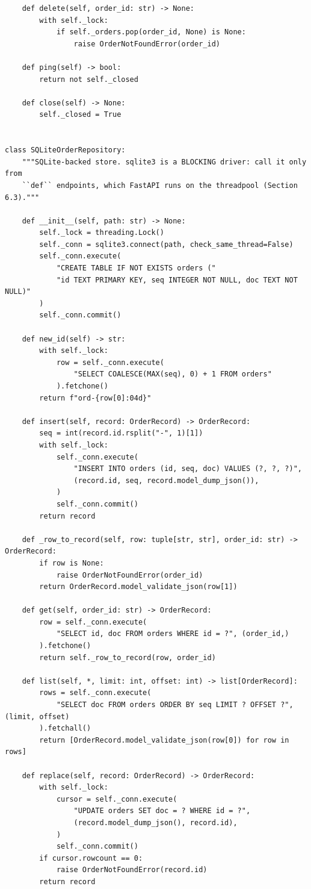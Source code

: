 \begin{verbatim}
    def delete(self, order_id: str) -> None:
        with self._lock:
            if self._orders.pop(order_id, None) is None:
                raise OrderNotFoundError(order_id)

    def ping(self) -> bool:
        return not self._closed

    def close(self) -> None:
        self._closed = True


class SQLiteOrderRepository:
    """SQLite-backed store. sqlite3 is a BLOCKING driver: call it only from
    ``def`` endpoints, which FastAPI runs on the threadpool (Section 6.3)."""

    def __init__(self, path: str) -> None:
        self._lock = threading.Lock()
        self._conn = sqlite3.connect(path, check_same_thread=False)
        self._conn.execute(
            "CREATE TABLE IF NOT EXISTS orders ("
            "id TEXT PRIMARY KEY, seq INTEGER NOT NULL, doc TEXT NOT NULL)"
        )
        self._conn.commit()

    def new_id(self) -> str:
        with self._lock:
            row = self._conn.execute(
                "SELECT COALESCE(MAX(seq), 0) + 1 FROM orders"
            ).fetchone()
        return f"ord-{row[0]:04d}"

    def insert(self, record: OrderRecord) -> OrderRecord:
        seq = int(record.id.rsplit("-", 1)[1])
        with self._lock:
            self._conn.execute(
                "INSERT INTO orders (id, seq, doc) VALUES (?, ?, ?)",
                (record.id, seq, record.model_dump_json()),
            )
            self._conn.commit()
        return record

    def _row_to_record(self, row: tuple[str, str], order_id: str) -> OrderRecord:
        if row is None:
            raise OrderNotFoundError(order_id)
        return OrderRecord.model_validate_json(row[1])

    def get(self, order_id: str) -> OrderRecord:
        row = self._conn.execute(
            "SELECT id, doc FROM orders WHERE id = ?", (order_id,)
        ).fetchone()
        return self._row_to_record(row, order_id)

    def list(self, *, limit: int, offset: int) -> list[OrderRecord]:
        rows = self._conn.execute(
            "SELECT doc FROM orders ORDER BY seq LIMIT ? OFFSET ?", (limit, offset)
        ).fetchall()
        return [OrderRecord.model_validate_json(row[0]) for row in rows]

    def replace(self, record: OrderRecord) -> OrderRecord:
        with self._lock:
            cursor = self._conn.execute(
                "UPDATE orders SET doc = ? WHERE id = ?",
                (record.model_dump_json(), record.id),
            )
            self._conn.commit()
        if cursor.rowcount == 0:
            raise OrderNotFoundError(record.id)
        return record


\end{verbatim}
